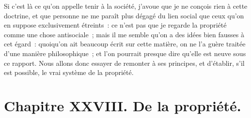 \documentclass[french,twoside]{book} %
\newcommand\chapteropen{} %
\newcommand\chapterclose{} %
\begin{document}
Si c’est là ce qu’on appelle tenir à la société, j’avoue que je ne conçois rien à cette doctrine, et que personne ne me paraît plus dégagé du lien social que ceux qu’on en suppose exclusivement étreints : ce n’est pas que je regarde la propriété comme une chose antisociale ; mais il me semble qu’on a des idées bien fausses à cet égard : quoiqu’on ait beaucoup écrit sur cette matière, on ne l’a guère traitée d’une manière philosophique ; et l’on pourrait presque dire qu’elle est neuve sous ce rapport. Nous allons donc essayer de remonter à ses principes, et d’établir, s’il est possible, le vrai système de la propriété.
\chapterclose


\chapteropen
\chapter[{Chapitre XXVIII. De la propriété.}]{Chapitre XXVIII. De la propriété.}\renewcommand{\leftmark}{Chapitre XXVIII. De la propriété.}
\end{document}
